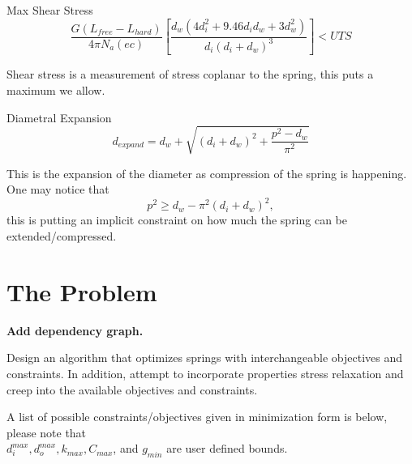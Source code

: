\documentclass[10pt]{article}
\begin{document}
		
			 Max Shear Stress\begin{equation} \frac{G(L_{free} - L_{hard})}{4 \pi N_{a} (ec)} \left[\frac{d_{w} (4d_{i}^{2} + 9.46d_{i} 
d_{w} + 3 d_{w}^{2})}{d_{i}(d_{i}+d_{w})^{3}}\right]< UTS\end{equation}

				Shear stress is a measurement of stress coplanar to the spring, this puts a maximum we allow. 
		
			Diametral Expansion\begin{equation} d_{expand} = d_{w} + \sqrt{(d_{i} + d_{w})^{2} + \frac{p^{2} - d_{w}}{\pi^{2}}}
			\end{equation}
			
			This is the expansion of the diameter as compression of the spring is happening. One may notice that \begin{equation}p^{2} \ge d_{w} - \pi^{2} (d_{i} + d_{w})^{2},\end{equation} this is putting an implicit constraint on how much the spring can be extended/compressed.
			



			
			
\section{The Problem} 
\label{sec:Problem}

\textbf{Add dependency graph.} 

Design an algorithm that optimizes springs with interchangeable objectives and constraints. In addition, attempt to incorporate properties stress relaxation and creep into the available objectives and constraints. 

A list of possible constraints/objectives given in minimization form is below, please note that \\$d_{i}^{max}, d_{o}^{max}, k_{max}, C_{max}$, and $g_{min}$ are user defined bounds. 
\end{document}
